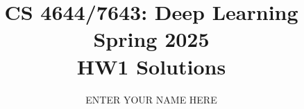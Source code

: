 \documentclass[11pt,english]{article}
\begin{document}
\title{CS 4644/7643: Deep Learning \\
Spring 2025\\ HW1 Solutions}
\author{ENTER YOUR NAME HERE}
\maketitle


\end{document}
